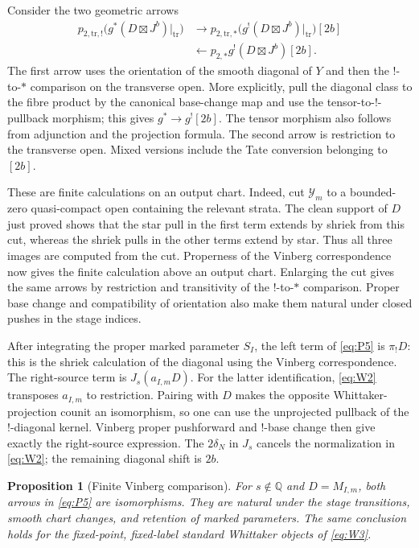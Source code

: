 \documentclass[11pt]{article}
\numberwithin{equation}{section}
\newtheorem{proposition}[theorem]{Proposition}
\theoremstyle{definition}
\theoremstyle{remark}
\begin{document}
Consider the two geometric arrows
\begin{equation}\label{eq:P5}
\begin{split}
 p_{2,\mathrm{tr},!}
       \bigl(g^*(D\boxtimes J^b)|_{\mathrm{tr}}\bigr)
 &\longrightarrow
 p_{2,\mathrm{tr},*}
       \bigl(g^!(D\boxtimes J^b)|_{\mathrm{tr}}\bigr)[2b]
 \\[-2pt]
 &\longleftarrow
 p_{2,*}g^!(D\boxtimes J^b)[2b].
\end{split}
\end{equation}
The first arrow uses the orientation of the smooth diagonal
of $Y$ and then the $!$-to-$*$ comparison on the transverse
open.  More explicitly, pull the diagonal class to the
fibre product by the canonical base-change map and use the
tensor-to-$!$-pullback morphism; this gives
$g^*\to g^![2b]$.  The tensor morphism also follows from
adjunction and the projection formula.  The second arrow
is restriction to the transverse open.  Mixed versions
include the Tate conversion belonging to $[2b]$.

These are finite calculations on an output chart.  Indeed,
cut $\mathcal Y_m$ to a bounded-zero quasi-compact open
containing the relevant strata.  The clean support of $D$
just proved shows that the star pull in the first term
extends by shriek from this cut, whereas the shriek pulls
in the other terms extend by star.  Thus all three images
are computed from the cut.  Properness of the Vinberg
correspondence now gives the finite calculation above an
output chart.  Enlarging the cut gives the same arrows by
restriction and transitivity of the $!$-to-$*$ comparison.
Proper base change and compatibility of orientation also
make them natural under closed pushes in the stage indices.

After integrating the proper marked parameter $S_I$, the
left term of \eqref{eq:P5} is $\pi_!D$: this is the
shriek calculation of the diagonal using the Vinberg
correspondence.  The right-source term is $J_s(a_{I,m}D)$.
For the latter identification, \eqref{eq:W2} transposes
$a_{I,m}$ to restriction.  Pairing with $D$ makes the
opposite Whittaker-projection counit an isomorphism, so
one can use the unprojected pullback of the $!$-diagonal
kernel.  Vinberg proper pushforward and $!$-base change
then give exactly the right-source expression.  The
$2\delta_N$ in $J_s$ cancels the normalization in
\eqref{eq:W2}; the remaining diagonal shift is $2b$.

\begin{proposition}[Finite Vinberg comparison]\label{deform:vinberg}
For $s\notin\mathbb Q$ and $D=M_{I,m}$, both arrows in
\eqref{eq:P5} are isomorphisms.  They are natural under the
stage transitions, smooth chart changes, and retention of
marked parameters.  The same conclusion holds for the
fixed-point, fixed-label standard Whittaker objects of
\eqref{eq:W3}.
\end{proposition}
\end{document}
